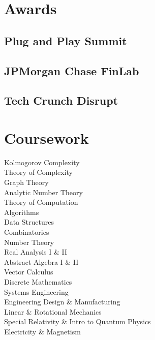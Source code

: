 \documentclass[]{jhearn-resume}
\begin{document}
\begin{minipage}[t]{0.34\textwidth} 

\vspace{25pt}

\vspace{-\topsep}

\section{Awards}
\subsection{Plug and Play Summit}
\sectionsep

\subsection{JPMorgan Chase FinLab}
\sectionsep

\subsection{Tech Crunch Disrupt}
\sectionsep


\section{Coursework}
\small Kolmogorov Complexity\\
Theory of Complexity\\
Graph Theory\\
Analytic Number Theory\\
Theory of Computation \\
Algorithms \\
Data Structures \\
Combinatorics \\
Number Theory \\
Real Analysis I \& II \\
Abstract Algebra I \& II\\
Vector Calculus\\
Discrete Mathematics\\
Systems Engineering\\
Engineering Design \& Manufacturing\\
Linear \& Rotational Mechanics\\
Special Relativity \& Intro to Quantum Physics\\
Electricity \& Magnetism\\
\sectionsep
\vspace{-\topsep}

\end{minipage}
\end{document}
